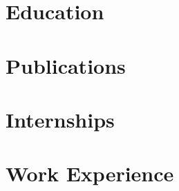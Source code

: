\documentclass{prometheus_cv}
\begin{document}
\thispagestyle{empty}					%
\pagestyle{fancy}			 		%

\vspace*{-1cm}
\centering


\vspace*{0.15cm}
\section{Education}


\section{Publications}


\section{Internships}


\section{Work Experience}


%

%


%


%
\end{document}
